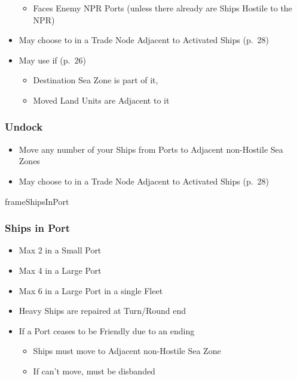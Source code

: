 \documentclass[10pt]{article}
\begin{document}
\begin{itemize}
\begin{itemize}
		\item Faces Enemy NPR Ports (unless there already are Ships Hostile to the NPR)
	\end{itemize}
	\item May choose to  in a Trade Node Adjacent to Activated Ships (p.~28)
	\item {}May use  if (p.~26)
	\begin{itemize}
		\item Destination Sea Zone is part of it, 
		\item Moved Land Units are Adjacent to it
	\end{itemize}
\end{itemize}
\subsubsection*{Undock}
\begin{itemize}
	\item Move any number of your Ships from Ports to Adjacent non-Hostile Sea Zones
	\item May choose to  in a Trade Node Adjacent to Activated Ships (p.~28)
\end{itemize}

\begin{dynamiccontents*}{frameShipsInPort}
	\subsubsection*{Ships in Port }
	\begin{itemize}
		\item Max 2 in a Small Port
		\item Max 4 in a Large Port
		\item Max 6 in a Large Port in a single Fleet
		\item Heavy Ships are repaired at Turn/Round end
		\item If a Port ceases to be Friendly due to an ending \alliance
		\begin{itemize}
			\item Ships must move to Adjacent non-Hostile Sea Zone
			\item If can't move, must be disbanded 
		\end{itemize}
	\end{itemize}
\end{dynamiccontents*}
\end{document}
